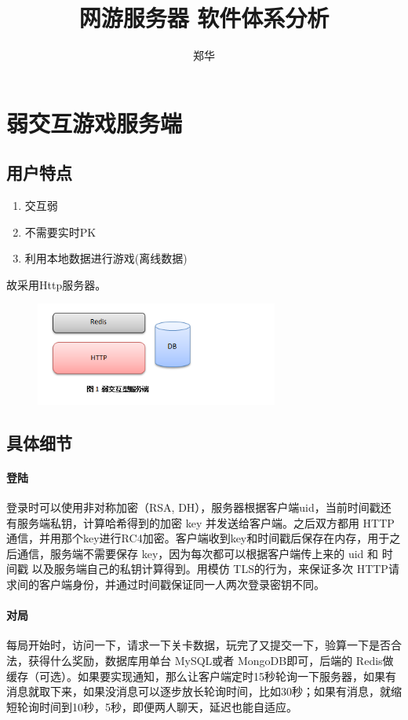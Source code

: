 \documentclass[UTF8,a4paper,8pt]{ctexart}
\author{郑华}
\title{网游服务器 软件体系分析}
\begin{document}
 	\maketitle
\newpage
  
\section{弱交互游戏服务端}

	\subsection{用户特点}
		\begin{enumerate}[fullwidth,itemindent = 2em]
			\item  交互弱
			\item  不需要实时PK
			\item  利用本地数据进行游戏(离线数据)
		\end{enumerate}
		
		故采用Http服务器。
     
	    \begin{figure}[h] 	
	    	\centering
	    	\includegraphics[width=8cm,clip]{weakServer.png} 	
	    	\label{fig:weakServer}
	    \end{figure} 
	    
	 \subsection{具体细节}
		 \paragraph{登陆}登录时可以使用非对称加密（RSA, DH），服务器根据客户端uid，当前时间戳还有服务端私钥，计算哈希得到的加密 key 并发送给客户端。之后双方都用 HTTP通信，并用那个key进行RC4加密。客户端收到key和时间戳后保存在内存，用于之后通信，服务端不需要保存 key，因为每次都可以根据客户端传上来的 uid 和 时间戳 以及服务端自己的私钥计算得到。用模仿 TLS的行为，来保证多次 HTTP请求间的客户端身份，并通过时间戳保证同一人两次登录密钥不同。
    
	    \paragraph{对局}每局开始时，访问一下，请求一下关卡数据，玩完了又提交一下，验算一下是否合法，获得什么奖励，数据库用单台 MySQL或者 MongoDB即可，后端的 Redis做缓存（可选）。如果要实现通知，那么让客户端定时15秒轮询一下服务器，如果有消息就取下来，如果没消息可以逐步放长轮询时间，比如30秒；如果有消息，就缩短轮询时间到10秒，5秒，即便两人聊天，延迟也能自适应。
	    
\end{document}
